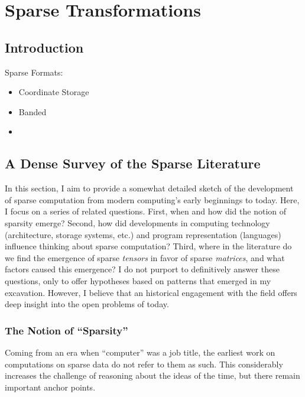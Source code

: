 
\chapter{Sparse Transformations}


\section{Introduction}



Sparse Formats:
\begin{itemize}
\item Coordinate Storage
\item Banded
\item 
\end{itemize}


\section{A Dense Survey of the Sparse Literature}


In this section, I aim to provide a somewhat detailed sketch of the development of sparse computation from modern computing's early beginnings to today.
Here, I focus on a series of related questions.
First, when and how did the notion of sparsity emerge?
Second, how did developments in computing technology (architecture, storage systems, etc.) and program representation (languages) influence thinking about sparse computation?
Third, where in the literature do we find the emergence of sparse \textit{tensors} in favor of sparse \textit{matrices}, and what factors caused this emergence? 
I do not purport to definitively answer these questions, only to offer hypotheses based on patterns that emerged in my excavation.
However, I believe that an historical engagement with the field offers deep insight into the open problems of today.

\subsection{The Notion of \enquote{Sparsity}}

Coming from an era when \enquote{computer} was a job title, the earliest work on computations on sparse data do not refer to them as such. 
This considerably increases the challenge of reasoning about the ideas of the time, but there remain important anchor points. 

